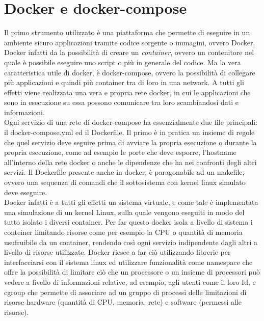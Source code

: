 \documentclass[a4paper,titlepage,12pt]{book}
\begin{document}
\section{\sffamily
Docker e docker-compose}
Il primo strumento utilizzato è una piattaforma che permette di eseguire in un ambiente sicuro applicazioni tramite codice sorgente o immagini, ovvero Docker. Docker infatti da la possibilità di creare un \textit{container}, ovvero un contenitore nel quale è possibile eseguire uno script o più in generale del codice. Ma la vera caratteristica utile di docker, è docker-compose, ovvero la possibilità di collegare più applicazioni e quindi più container tra di loro in una network. A tutti gli effetti viene realizzata una vera e propria rete docker, in cui le applicazioni che sono in esecuzione su essa possono comunicare tra loro scambiandosi dati e informazioni.\\
Ogni servizio di una rete di docker-compose ha essenzialmente due file principali: il docker-compose.yml ed il Dockerfile. Il primo è in pratica un insieme di regole che quel servizio deve seguire prima di avviare la propria esecuzione o durante la propria esecuzione, come ad esempio le porte che deve esporre, l'hostname all'interno della rete docker o anche le dipendenze che ha nei confronti degli altri servizi. Il Dockerfile presente anche in docker, è paragonabile ad un makefile, ovvero una sequenza di comandi che il sottosistema con kernel linux simulato deve eseguire.\\
Docker infatti è a tutti gli effetti un sistema virtuale, e come tale è implementata una simulazione di un kernel Linux, sulla quale vengono eseguiti in modo del tutto isolato i diversi container.
Per far questo docker isola a livello di sistema i conteiner limitando risorse come per esempio la CPU o quantità di memoria usufruibile da un container, rendendo così ogni servizio indipendente dagli altri a livello di risorse utilizzate. Docker riesce a far ciò utilizzando librerie per interfacciarsi con il sistema linux ed utilizzare funzionalità come namespace che offre la possibilità di limitare ciò che un processore o un insieme di processori può vedere a livello di informazioni relative, ad esempio, agli utenti come il loro Id, e cgroup che permette di associare ad un gruppo di processi delle limitazioni di risorse hardware (quantità di CPU, memoria, rete) e software (permessi alle risorse).

\sffamily
\end{document}
